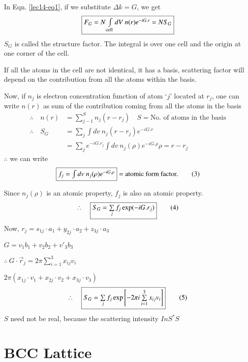 In Eqn. \eqref{lec14-eq1}, if we substitute $\Delta k=G$, we get
$$
\fbox{$F_{G}=N\int\limits_{\text{cell}}dV \ n(r)e^{-iG.r}=NS_{G}$}
$$
$S_{G}$ is called the structure factor. The integral is over one cell and the origin at one corner of the cell.

If all the atoms in the cell are not identical, it has a basis, scattering factor will depend on the contribution from all the atoms within the basis.

Now, if $n_{j}$ is electron concentration function of atom `$j$' located at $r_{j}$, one can write $n(r)$ as sum of the contribution coming from all the atoms in the basis
\begin{align*}
\therefore\quad n(r) &= \sum\limits^{S}_{j-1}n_{j}(r-r_{j})\quad S=\text{No. of atoms in the basis}\\
\therefore\quad S_{G} &= \sum\limits_{j}\int dv \ n_{j}(r-r_{j})e^{-iG.r}\\
&= \sum\limits_{j}e^{-iG.r_{j}}\int dv \ n_{j}(\rho)e^{-iG.\rho}\rho=r-r_{j}
\end{align*}
$\therefore$ we can write
\begin{equation*}
\fbox{$f_{j}=\int dv \ n_{j}(\rho)e^{-iG.\rho}$}=\text{atomic form factor.}\tag{3}\label{lec14-eq3}
\end{equation*}

Since $n_{j}(\rho)$ is an atomic property, $f_{j}$ is also an atomic property.
\begin{equation*}
\therefore\quad \fbox{$S_{G}=\sum\limits_{j}f_{j}\exp (-iG.r_{j})$}\tag{4}\label{lec14-eq4}
\end{equation*}
Now, $r_{j}=s_{1j}\cdot a_{1}+y_{2j}\cdot a_{2}+z_{3j}\cdot a_{3}$

$G=v_{1}b_{1}+v_{2}b_{2}+v'_{3}b_{3}$

$\therefore \ G\cdot \overrightarrow{r}_{j}=2\pi \sum\limits^{3}_{i=1}x_{ij}v_{i}$

$2\pi (x_{1j}\cdot v_{1}+x_{2j}\cdot v_{2}+x_{3j}\cdot v_{3})$
\begin{equation*}
\therefore\quad \fbox{$S_{G}=\sum\limits_{j}f_{j}\exp \left[-2\pi i \sum\limits^{3}_{i=1}x_{ij}v_{i}\right]$}\tag{5}\label{lec14-eq5}
\end{equation*}
$S$ need not be real, because the scattering intensity $InS^{*}S$

\section*{BCC Lattice}


